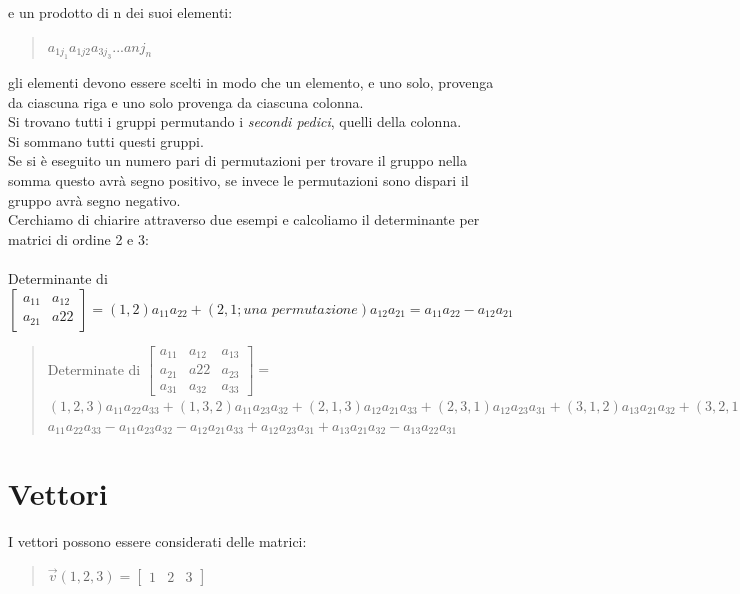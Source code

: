 \documentclass[a4paper]{article}
\begin{document}
e un prodotto di n dei suoi elementi: 
\\\begin{quote} \centering
$a_{1j_{1}} a_{1j{2}} a_{3j_{3}} ... a {nj_{n}}$
\end{quote}
gli elementi devono essere scelti in modo che un elemento, e uno solo, provenga da ciascuna riga e uno solo provenga da ciascuna colonna.
\\ Si trovano tutti i gruppi permutando i \textit{secondi pedici}, quelli della colonna.
\\ Si sommano tutti questi gruppi.
\\ Se si è eseguito un numero pari di permutazioni per trovare il gruppo nella somma questo avrà segno positivo, se invece le permutazioni sono dispari il gruppo avrà segno negativo.
\\ Cerchiamo di chiarire attraverso due esempi e calcoliamo il determinante per matrici di ordine 2 e 3:
\\
\\ Determinante di $\left[\begin{matrix}a_{11} & a_{12} \\ a_{21} & a{22} \end{matrix}\right]
= (1,2) a_{11} a_{22} + (2,1; \textit{una permutazione}) a_{12}a_{21}= a_{11} a_{22} - a_{12}a_{21}
$
\begin{quote} \centering
Determinate di $\left[\begin{matrix}a_{11} & a_{12} & a_{13} \\ a_{21} & a{22} & a_{23} \\ a_{31} & a_{32} & a_{33} \end{matrix}\right] =$
\bigskip \\ 
$(1,2,3) a_{11}a_{22}a_{33} + (1,3,2) a_{11}a_{23}a_{32} + (2,1,3) a_{12}a_{21}a_{33} + (2,3,1) a_{12}a_{23}a_{31} + (3,1,2) a_{13}a_{21}a_{32} + (3,2,1) a_{13}a_{22}a_{31} = $
\bigskip \\ 
$a_{11}a_{22}a_{33} - a_{11}a_{23}a_{32} - a_{12}a_{21}a_{33} + a_{12}a_{23}a_{31} + a_{13}a_{21}a_{32} - a_{13}a_{22}a_{31} 
$\end{quote}

\section{Vettori}
I vettori possono essere considerati delle matrici:
\\
\begin{quote} \centering
$\vec{v}(1,2,3) =\left[\begin{matrix} 1 & 2 & 3\end{matrix}\right]
$\end{quote}
\end{document}
